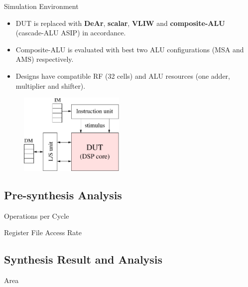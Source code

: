 \documentclass{beamer}
\begin{document}
\begin{CJK}{UTF8}{bkai}
    \begin{frame}{Simulation Environment}
            \begin{itemize}
                \item DUT is replaced with \textbf{DeAr}, \textbf{scalar}, \textbf{VLIW} and \textbf{composite-ALU} (cascade-ALU ASIP) in accordance.
                \item Composite-ALU is evaluated with best two ALU configurations (MSA and AMS) respectively.
                \item Designs have compatible RF (32 cells) and ALU resources (one adder, multiplier and shifter).
            \end{itemize}
            \begin{figure}[!ht] 
                \centering
                \includegraphics[width=0.45\textwidth]{./figs/sim.eps}
            \end{figure}
    \end{frame}

    \subsection{Pre-synthesis Analysis}

    \begin{frame}{Operations per Cycle}
        
    \end{frame}

    \begin{frame}{Register File Access Rate}
        
    \end{frame}

    \subsection{Synthesis Result and Analysis}

    \begin{frame}{Area}
        
    \end{frame}


\end{CJK}
\end{document}
